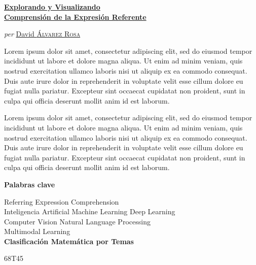 \clearpage
\thispagestyle{plain}
\null\vfill

\begin{otherlanguage}{catalan}
  \begin{center}
    \Large
    \href{https://recomprehension.com/}{\textbf{Explorando y Visualizando\\
        Comprensión de la Expresión Referente}}

    \vspace{2ex} \large \textit{per}
    \href{https://david.alvarezrosa.com/}{David \textsc{Álvarez Rosa}}

    \vspace{3ex} \textbf{\abstractname}
  \end{center}

  \vspace{-2ex}
  \noindent Lorem ipsum dolor sit amet, consectetur adipiscing elit, sed do
  eiusmod tempor incididunt ut labore et dolore magna aliqua. Ut enim ad minim
  veniam, quis nostrud exercitation ullamco laboris nisi ut aliquip ex ea
  commodo consequat. Duis aute irure dolor in reprehenderit in voluptate velit
  esse cillum dolore eu fugiat nulla pariatur. Excepteur sint occaecat
  cupidatat non proident, sunt in culpa qui officia deserunt mollit anim id est
  laborum.

  Lorem ipsum dolor sit amet, consectetur adipiscing elit, sed do eiusmod
  tempor incididunt ut labore et dolore magna aliqua. Ut enim ad minim veniam,
  quis nostrud exercitation ullamco laboris nisi ut aliquip ex ea commodo
  consequat. Duis aute irure dolor in reprehenderit in voluptate velit esse
  cillum dolore eu fugiat nulla pariatur. Excepteur sint occaecat cupidatat non
  proident, sunt in culpa qui officia deserunt mollit anim id est laborum.

  \begin{center}


    \bigskip\smallskip \textbf{Palabras clave}

    Referring Expression Comprehension\\
    Inteligencia Artificial \textbullet{} Machine Learning \textbullet{} Deep
    Learning\\
    Computer Vision \textbullet{} Natural Language Processing\\
    Multimodal Learning\\

    \bigskip \textbf{Clasificación Matemática por Temas}

    68T45
  \end{center}
\end{otherlanguage}
\vfill\null



